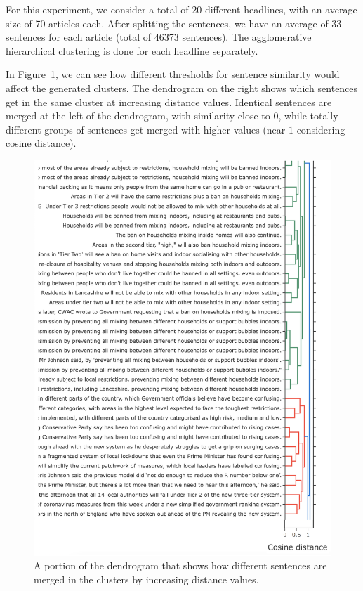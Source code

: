 For this experiment, we consider a total of 20 different headlines, with an average size of 70 articles each.
After splitting the sentences, we have an average of 33 sentences for each article (total of 46373 sentences).
The agglomerative hierarchical clustering is done for each headline separately.

In Figure~\ref{fig:dendrogram}, we can see how different thresholds for sentence similarity would affect the generated clusters. The dendrogram on the right shows which sentences get in the same cluster at increasing distance values. Identical sentences are merged at the left of the dendrogram, with similarity close to $0$, while totally different groups of sentences get merged with higher values (near $1$ considering cosine distance).
\begin{figure}[!htb]
    \centering
    \includegraphics[width=\linewidth]{figures/dendrogram_high_legend.png}
    \caption{A portion of the dendrogram that shows how different sentences are merged in the clusters by increasing distance values.}
    \label{fig:dendrogram}
\end{figure}

